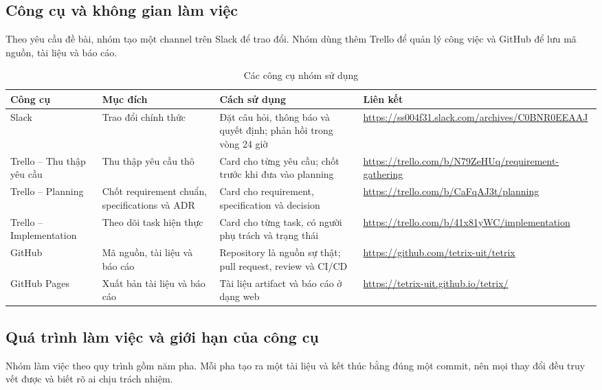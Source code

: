 \documentclass[12pt,a4paper]{article}
\begin{document}
\subsection{Công cụ và không gian làm việc}

Theo yêu cầu đề bài, nhóm tạo một channel trên Slack để trao đổi. Nhóm dùng thêm
Trello để quản lý công việc và GitHub để lưu mã nguồn, tài liệu và báo cáo.

\begin{table}[H]
  \centering
  \small
  \caption{Các công cụ nhóm sử dụng}
  \begin{tabularx}{\textwidth}{P{3.1cm} P{3.2cm} Y P{3.5cm}}
    \toprule
    \textbf{Công cụ} & \textbf{Mục đích} & \textbf{Cách sử dụng} & \textbf{Liên kết} \\
    \midrule
    Slack & Trao đổi chính thức & Đặt câu hỏi, thông báo và quyết định; phản hồi trong vòng 24 giờ & \url{https://ss004f31.slack.com/archives/C0BNR0EEAAJ} \\
    Trello -- Thu thập yêu cầu & Thu thập yêu cầu thô & Card cho từng yêu cầu; chốt trước khi đưa vào planning & \url{https://trello.com/b/N79ZeHUq/requirement-gathering} \\
    Trello -- Planning & Chốt requirement chuẩn, specifications và ADR & Card cho requirement, specification và decision & \url{https://trello.com/b/CaFqAJ3t/planning} \\
    Trello -- Implementation & Theo dõi task hiện thực & Card cho từng task, có người phụ trách và trạng thái & \url{https://trello.com/b/41x81yWC/implementation} \\
    GitHub & Mã nguồn, tài liệu và báo cáo & Repository là nguồn sự thật; pull request, review và CI/CD & \url{https://github.com/tetrix-uit/tetrix} \\
    GitHub Pages & Xuất bản tài liệu và báo cáo & Tài liệu artifact và báo cáo ở dạng web & \url{https://tetrix-uit.github.io/tetrix/} \\
    \bottomrule
  \end{tabularx}
\end{table}

\subsection{Quá trình làm việc và giới hạn của công cụ}

Nhóm làm việc theo quy trình gồm năm pha. Mỗi pha tạo ra một tài liệu và kết thúc
bằng đúng một commit, nên mọi thay đổi đều truy vết được và biết rõ ai chịu trách
nhiệm.
\end{document}
